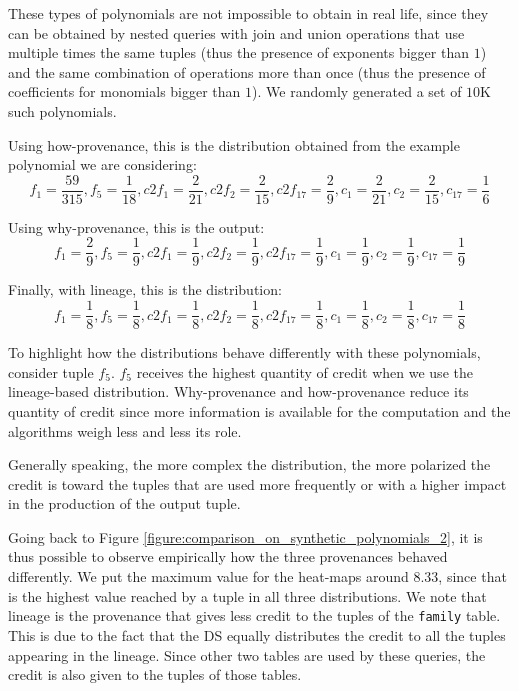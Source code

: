 These types of polynomials are not impossible to obtain in real life, since they can be obtained by nested queries with join and union operations that use multiple times the same tuples (thus the presence of exponents bigger than $1$) and the same combination of operations more than once (thus the presence of coefficients for monomials bigger than $1$). 
We randomly generated a set of $10$K such polynomials. 

Using how-provenance, this is the distribution obtained from the example polynomial we are considering:
{\footnotesize
\[
f_1 = \frac{59}{315}, f_5 = \frac{1}{18}, c2f_1 = \frac{2}{21}, c2f_2 = \frac{2}{15}, 
c2f_{17}=\frac{2}{9} , c_1 = \frac{2}{21}, c_2 = \frac{2}{15}, c_{17} = \frac{1}{6} 
\]
}

Using why-provenance, this is the output:
{\footnotesize
\[
f_1 = \frac{2}{9}, f_5 = \frac{1}{9}, c2f_1 = \frac{1}{9}, c2f_2 = \frac{1}{9}, 
c2f_{17}=\frac{1}{9} , c_1 = \frac{1}{9}, c_2 = \frac{1}{9}, c_{17} = \frac{1}{9} 
\]
}


Finally, with lineage, this is the distribution:
{\footnotesize
\[
f_1 = \frac{1}{8}, f_5 = \frac{1}{8}, c2f_1 = \frac{1}{8}, c2f_2 = \frac{1}{8}, 
c2f_{17}=\frac{1}{8} , c_1 = \frac{1}{8}, c_2 = \frac{1}{8}, c_{17} = \frac{1}{8} 
\]
}

To highlight how the distributions behave differently with these polynomials, consider tuple $f_5$.
$f_5$ receives the highest quantity of credit when we use the lineage-based distribution. Why-provenance and how-provenance reduce its quantity of credit since more information is available for the computation and the algorithms weigh less and less its role. 

Generally speaking, the more complex the distribution, the more polarized the credit is toward the tuples that are used more frequently or with a higher impact in the production of the output tuple. 

Going back to Figure \ref{figure:comparison_on_synthetic_polynomials_2}, it is thus possible to observe empirically how the three provenances behaved differently. We put the maximum value for the heat-maps around $8.33$, since that is the highest value reached by a tuple in all three distributions. 
We note that lineage is the provenance that gives less credit to the tuples of the \texttt{family} table. This is due to the fact that the DS equally distributes the credit to all the tuples appearing in the lineage. Since other two tables are used by these queries, the credit is also given to the tuples of those tables. 

